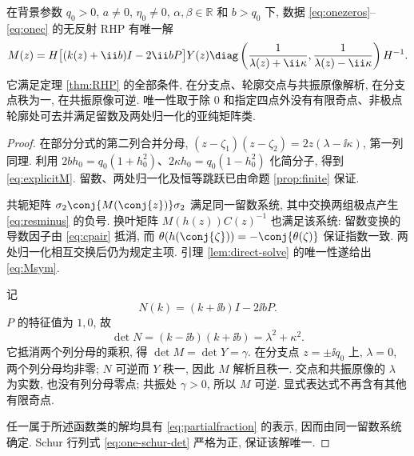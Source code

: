\begin{theorem}[完整四点轨道的矩阵解]\label{thm:oneRHP}\label{prop:unique-reflectionless}
在背景参数 $q_0>0$, $a\ne0$, $\eta_0\ne0$, $\alpha,\beta\in\mathbb R$ 和 $b>q_0$ 下, 数据 \eqref{eq:onezeros}--\eqref{eq:onec} 的无反射 RHP 有唯一解
\begin{equation}\label{eq:explicitM}
M(z)=H\bigl[(k(z)+\ii b)I-2\ii bP\bigr]Y(z)
\diag\left(\dfrac{1}{\lambda(z)+\ii\kappa},\dfrac{1}{\lambda(z)-\ii\kappa}\right)H^{-1}.
\end{equation}
它满足定理 \ref{thm:RHP} 的全部条件, 在分支点、轮廓交点与共振原像解析, 在分支点秩为一, 在共振原像可逆. 唯一性取于除 $0$ 和指定四点外没有有限奇点、非极点轮廓处可去并满足留数及两处归一化的亚纯矩阵类.
\end{theorem}
\begin{proof}
在部分分式的第二列合并分母,
$(z-\zeta_1)(z-\zeta_2)=2z(\lambda-\ii\kappa)$, 第一列同理. 利用
$2bh_0=q_0(1+h_0^2)$、$2\kappa h_0=q_0(1-h_0^2)$ 化简分子, 得到 \eqref{eq:explicitM}. 留数、两处归一化及恒等跳跃已由命题 \ref{prop:finite} 保证.

共轭矩阵 $\sigma_2\conj{M(\conj{z})}\sigma_2$ 满足同一留数系统, 其中交换两组极点产生 \eqref{eq:resminus} 的负号. 换叶矩阵 $M(h(z))C(z)^{-1}$ 也满足该系统: 留数变换的导数因子由 \eqref{eq:cpair} 抵消, 而 $\theta(h(\conj{\zeta}))=-\conj{\theta(\zeta)}$ 保证指数一致. 两处归一化相互交换后仍为规定主项. 引理 \ref{lem:direct-solve} 的唯一性遂给出 \eqref{eq:Msym}.

记
\begin{equation}\label{eq:Nfactor}
N(k)=(k+\ii b)I-2\ii bP.
\end{equation}
$P$ 的特征值为 $1,0$, 故
\[
\det N=(k-\ii b)(k+\ii b)=\lambda^2+\kappa^2.
\]
它抵消两个列分母的乘积, 得 $\det M=\det Y=\gamma$. 在分支点 $z=\pm\ii q_0$ 上, $\lambda=0$, 两个列分母均非零; $N$ 可逆而 $Y$ 秩一, 因此 $M$ 解析且秩一. 交点和共振原像的 $\lambda$ 为实数, 也没有列分母零点; 共振处 $\gamma>0$, 所以 $M$ 可逆. 显式表达式不再含有其他有限奇点.

任一属于所述函数类的解均具有 \eqref{eq:partialfraction} 的表示, 因而由同一留数系统确定. Schur 行列式 \eqref{eq:one-schur-det} 严格为正, 保证该解唯一.
\end{proof}

